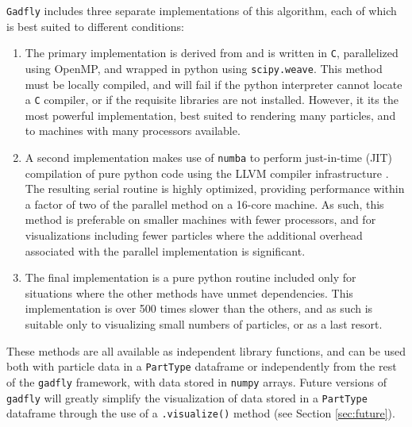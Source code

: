 \documentclass{thesis}
\newcommand{\code}[1]{\texttt{#1}}
\begin{document}
\code{Gadfly} includes three separate implementations of this algorithm, each of which is best suited to different conditions:
\begin{enumerate}
\item The primary implementation is derived from \citet{NavratilJohnsonBromm2007} and is written in \code{C}, parallelized using OpenMP, and wrapped in python using \code{scipy.weave}.  This method must be locally compiled, and will fail if the python interpreter cannot locate a \code{C} compiler, or if the requisite libraries are not installed.  However, it its the most powerful implementation, best suited to rendering many particles, and to machines with many processors available.
\item A second implementation makes use of \code{numba} \citep{LamPitrouSeibert2015} to perform just-in-time (JIT) compilation of pure python code using the LLVM compiler infrastructure \citep{LattnerAdve2004}.  The resulting serial routine is highly optimized, providing performance within a factor of two of the parallel method on a 16-core machine.  As such, this method is preferable on smaller machines with fewer processors, and for visualizations including fewer particles where the additional overhead associated with the parallel implementation is significant.
\item The final implementation is a pure python routine included only for situations where the other methods have unmet dependencies. This implementation is over 500 times slower than the others, and as such is suitable only to visualizing small numbers of particles, or as a last resort.
\end{enumerate}

These methods are all available as independent library functions, and can be used both with particle data in a \code{PartType} dataframe or independently from the rest of the \code{gadfly} framework, with data stored in \code{numpy} arrays.  
Future versions of \code{gadfly} will greatly simplify the visualization of data stored in a \code{PartType} dataframe through the use of a \code{.visualize()} method (see Section \ref{sec:future}).
\end{document}
